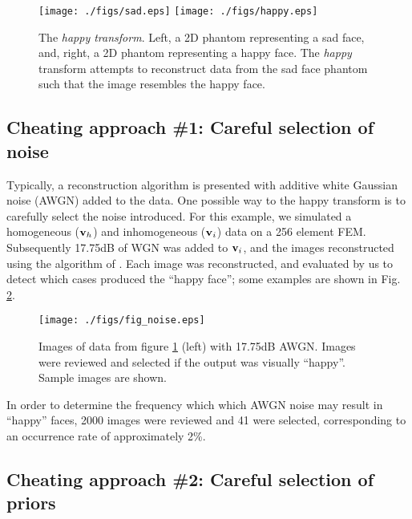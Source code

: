 \documentclass[12pt]{iopart}
\begin{document}
%
%
\begin{figure}[th]
\begin{flushright}
\texttt{[image: ./figs/sad.eps]}
\texttt{[image: ./figs/happy.eps]}
\caption{\small The 
{\em happy transform}. Left, a 2D phantom representing
a sad face, and, right, a 2D phantom representing a
happy face. The {\em happy} transform attempts to 
reconstruct data from the sad face phantom such that the
image resembles the happy face.
 }
 \label{fig:happytransform}
\end{flushright}
\end{figure}

\subsection{ Cheating approach \#1:
 Careful selection of noise }

Typically, a reconstruction algorithm is presented
with additive white Gaussian noise (AWGN) added to the data. One
possible way to the happy transform is to
carefully select the noise introduced.
For this example, we simulated a homogeneous (${\bf v}_h$)
and inhomogeneous (${\bf v}_i$) data on a 256
element FEM. Subsequently 17.75dB of WGN was added to
${\bf v}_i$, and the images reconstructed using
the algorithm of \cite{Adler_and_Guardo_1996}.
Each image was reconstructed, and evaluated by us to
detect which cases produced the ``happy face'';
some examples are shown in Fig. \ref{fig:happynoise}.

%
%
\begin{figure}[th]
\begin{flushright}
\texttt{[image: ./figs/fig\_noise.eps]}
\caption{\small 
Images of data from figure \ref{fig:happytransform} (left)
with 17.75dB AWGN. Images were reviewed and selected if
the output was visually ``happy''. Sample images are shown.
 }
 \label{fig:happynoise}
\end{flushright}
\end{figure}

In order to determine the frequency which which AWGN noise
may result in ``happy'' faces, 2000
images were reviewed and 41 were selected, corresponding
to an occurrence rate of approximately 2\%.

\subsection{ Cheating approach \#2:
             Careful selection of priors}
\end{document}
